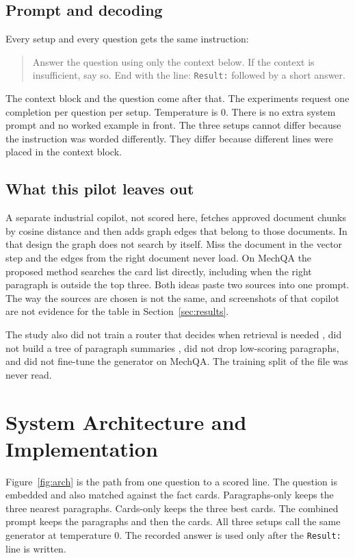 \documentclass[conference]{IEEEtran}
\begin{document}
\subsection{Prompt and decoding}
Every setup and every question gets the same instruction:
\begin{quote}
\small
Answer the question using only the context below. If the context is insufficient, say so. End with the line: \texttt{Result:} followed by a short answer.
\end{quote}
The context block and the question come after that. The experiments request one completion per question per setup. Temperature is 0. There is no extra system prompt and no worked example in front. The three setups cannot differ because the instruction was worded differently. They differ because different lines were placed in the context block.

\subsection{What this pilot leaves out}
A separate industrial copilot, not scored here, fetches approved document chunks by cosine distance and then adds graph edges that belong to those documents. In that design the graph does not search by itself. Miss the document in the vector step and the edges from the right document never load. On MechQA the proposed method searches the card list directly, including when the right paragraph is outside the top three. Both ideas paste two sources into one prompt. The way the sources are chosen is not the same, and screenshots of that copilot are not evidence for the table in Section~\ref{sec:results}.

The study also did not train a router that decides when retrieval is needed \cite{asai2024selfrag}, did not build a tree of paragraph summaries \cite{sarthi2024raptor}, did not drop low-scoring paragraphs, and did not fine-tune the generator on MechQA. The training split of the file was never read.

\section{System Architecture and Implementation}
Figure~\ref{fig:arch} is the path from one question to a scored line. The question is embedded and also matched against the fact cards. Paragraphs-only keeps the three nearest paragraphs. Cards-only keeps the three best cards. The combined prompt keeps the paragraphs and then the cards. All three setups call the same generator at temperature 0. The recorded answer is used only after the \texttt{Result:} line is written.
\end{document}
